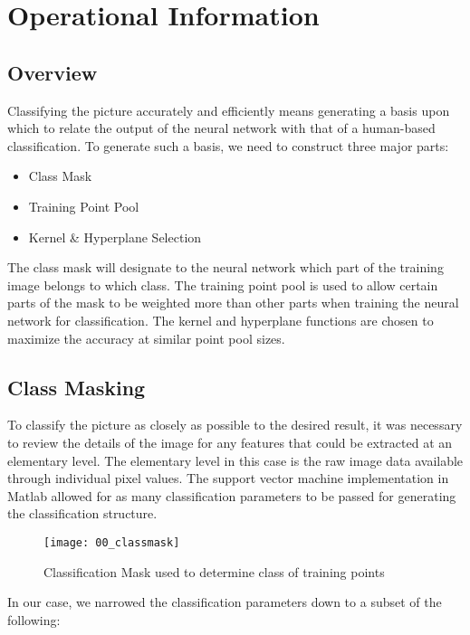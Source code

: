 \chapter{Operational Information}

\section{Overview}
Classifying the picture accurately and efficiently means generating a basis upon which to relate the output of the neural network with that of a human-based classification. To generate such a basis, we need to construct three major parts:

\begin{itemize}
    \item Class Mask
    \item Training Point Pool
    \item Kernel \& Hyperplane Selection
\end{itemize}

The class mask will designate to the neural network which part of the training image belongs to which class. The training point pool is used to allow certain parts of the mask to be weighted more than other parts when training the neural network for classification. The kernel and hyperplane functions are chosen to maximize the accuracy at similar point pool sizes.

\section{Class Masking}

To classify the picture as closely as possible to the desired result, it was necessary to review the details of the image for any features that could be extracted at an elementary level. The elementary level in this case is the raw image data available through individual pixel values. The support vector machine implementation in Matlab allowed for as many classification parameters to be passed for generating the classification structure. 

\begin{figure}[ht]
    \centering
    \texttt{[image: 00\_classmask]}
    \caption{Classification Mask used to determine class of training points}
    \label{fig:00_classmask}
\end{figure}

In our case, we narrowed the classification parameters down to a subset of the following:

